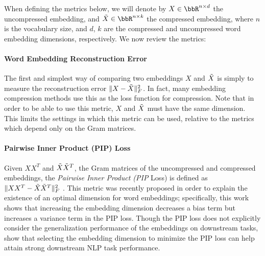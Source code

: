 When defining the metrics below, we will denote by $X \in \RR^{n\times d}$ the uncompressed embedding, and $\tX \in \RR^{n \times k}$ the compressed embedding, where $n$ is the vocabulary size, and $d$, $k$ are the compressed and uncompressed word embedding dimensions, respectively.
We now review the metrics:



\paragraph{Word Embedding Reconstruction Error}
The first and simplest way of comparing two embeddings $X$ and $\tX$ is simply to measure the reconstruction error $\|X-\tX\|_F^2$.
In fact, many embedding compression methods \citep{andrews16,dccl17} use this as the loss function for compression.
Note that in order to be able to use this metric, $X$ and $\tX$ must have the same dimension.
This limits the settings in which this metric can be used, relative to the metrics which depend only on the Gram matrices.

\paragraph{Pairwise Inner Product (PIP) Loss}
Given $XX^T$ and $\tX\tX^T$, the Gram matrices of the uncompressed and compressed embeddings, the \textit{Pairwise Inner Product (PIP} Loss) is defined as $\|XX^T -\tX\tX^T\|_F^2$ \citep{yin18}.
This metric was recently proposed in order to explain the existence of an optimal dimension for word embeddings;
specifically, this work shows that increasing the embedding dimension decreases a bias term but increases a variance term in the PIP loss.
Though the PIP loss does not explicitly consider the generalization performance of the embeddings on downstream tasks, \citep{yin18} show that selecting the embedding dimension to minimize the PIP loss can help attain strong downstream NLP task performance.

